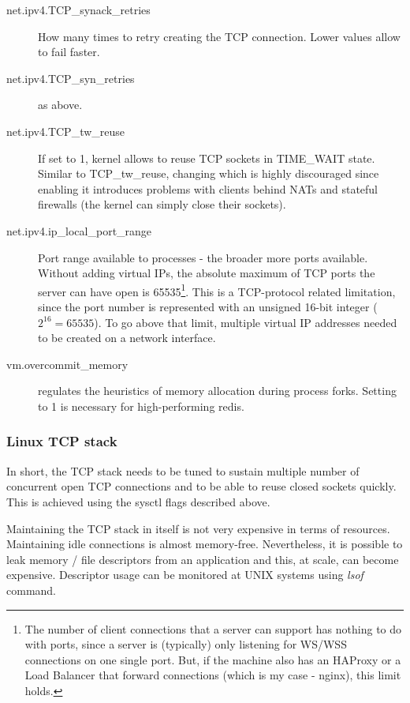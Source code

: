 \documentclass{uvamscse}
\begin{document}
\begin{description}
  \item[net.ipv4.TCP\_synack\_retries] How many times to retry creating the TCP connection. Lower values allow to fail faster.
  \item[net.ipv4.TCP\_syn\_retries] as above.
  \item[net.ipv4.TCP\_tw\_reuse] If set to 1, kernel allows to reuse TCP sockets in TIME\_WAIT state. Similar to TCP\_tw\_reuse, changing which is highly discouraged since enabling it introduces problems with clients behind NATs and stateful firewalls (the kernel can simply close their sockets).
  \item[net.ipv4.ip\_local\_port\_range] Port range available to processes - the broader more ports available. Without adding virtual IPs, the absolute maximum of TCP ports the server can have open is 65535\footnote{The number of client connections that a server can support has nothing to do with ports, since a server is (typically) only listening for WS/WSS connections on one single port. But, if the machine also has an HAProxy or a Load Balancer that forward connections (which is my case - nginx), this limit holds.}. This is a TCP-protocol related limitation, since the port number is represented with an unsigned 16-bit integer ($2^{16}=65535$). To go above that limit, multiple virtual IP addresses needed to be created on a network interface.
  \item[vm.overcommit\_memory] regulates the heuristics of memory allocation during process forks. Setting to 1 is necessary for high-performing redis.
\end{description}

\subsubsection{Linux TCP stack}

In short, the TCP stack needs to be tuned to sustain multiple number of concurrent open TCP connections and to be able to reuse closed sockets quickly. This is achieved using the sysctl flags described above.

Maintaining the TCP stack in itself is not very expensive in terms of resources. Maintaining idle connections is almost memory-free. Nevertheless, it is possible to leak memory / file descriptors from an application and this, at scale, can become expensive. Descriptor usage can be monitored at UNIX systems using \textit{lsof} command.
\end{document}
